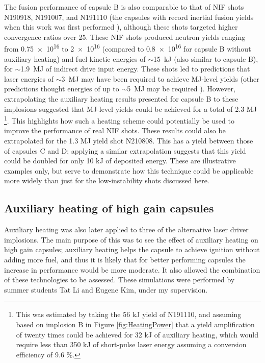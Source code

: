 The fusion performance of capsule B is also comparable to that of NIF shots N190918, N191007, and N191110 (the capsules with record inertial fusion yields when this work was first performed \cite{Zylstra2021}), although these shots targeted higher convergence ratios over 25. These NIF shots produced neutron yields ranging from \num{0.75e16} to \num{2e16} (compared to \num{0.8e16} for capsule B without auxiliary heating) and fuel kinetic energies of $\sim$15~kJ (also similar to capsule B), for $\sim$1.9~MJ of indirect drive input energy. These shots led to predictions that laser energies of $\sim$3~MJ \cite{Zylstra2021} may have been required to achieve MJ-level yields (other predictions thought energies of up to $\sim$5~MJ may be required \cite{Zylstra2021, Cheng2021}). However, extrapolating the auxiliary heating results presented for capsule B to these implosions suggested that MJ-level yields could be achieved for a total of 2.3 MJ \footnote{This was estimated by taking the 56 kJ yield of N191110, and assuming based on implosion B in Figure \ref{fig:HeatingPower} that a yield amplification of twenty times could be achieved for 32 kJ of auxiliary heating, which would require less than 350 kJ of short-pulse laser energy assuming a conversion efficiency of 9.6 \%.}. This highlights how such a heating scheme could potentially be used to improve the performance of real NIF shots. These results could also be extrapolated for the 1.3 MJ yield shot N210808. This has a yield between those of capsules C and D; applying a similar extrapolation suggests that this yield could be doubled for only 10 kJ of deposited energy. These are illustrative examples only, but serve to demonstrate how this technique could be applicable more widely than just for the low-instability shots discussed here.

\subsection{Auxiliary heating of high gain capsules}\label{sec:auxiliary-heating-of-high-gain-capsules}
Auxiliary heating was also later applied to three of the alternative laser driver implosions. The main purpose of this was to see the effect of auxiliary heating on high gain capsules; auxiliary heating helps the capsule to achieve ignition without adding more fuel, and thus it is likely that for better performing capsules the increase in performance would be more moderate. It also allowed the combination of these technologies to be assessed. These simulations were performed by summer students Tat Li and Eugene Kim, under my supervision.


